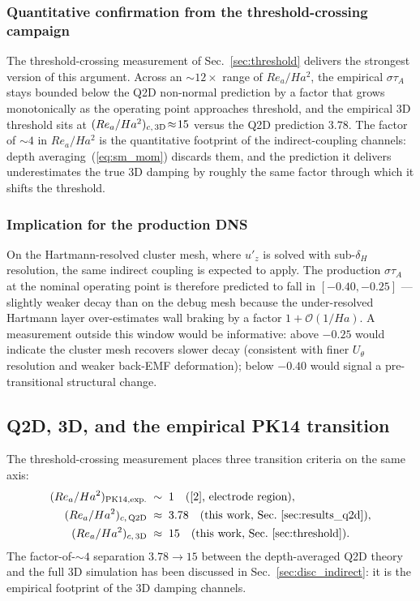 \documentclass[aps,prl,twocolumn,superscriptaddress]{revtex4-2}
\begin{document}
\subsubsection*{Quantitative confirmation from the threshold-crossing
campaign}
The threshold-crossing measurement of Sec.~\ref{sec:threshold}
delivers the strongest version of this argument.  Across an
$\sim\!12\!\times\!$ range of $Re_a/Ha^{2}$, the empirical
$\sigma\tau_A$ stays bounded below the Q2D non-normal prediction by
a factor that grows monotonically as the operating point approaches
threshold, and the empirical 3D threshold sits at
$(Re_a/Ha^{2})_{c,\,\rm 3D}\!\approx\!15$ versus the Q2D prediction
$3.78$.  The factor of $\sim\!4$ in $Re_a/Ha^{2}$ is the
quantitative footprint of the indirect-coupling channels: depth
averaging~(\ref{eq:sm_mom}) discards them, and the prediction it
delivers underestimates the true 3D damping by roughly the same
factor through which it shifts the threshold.

\subsubsection*{Implication for the production DNS}
On the Hartmann-resolved cluster mesh, where $u'_z$ is solved with
sub-$\delta_H$ resolution, the same indirect coupling is expected
to apply.  The production $\sigma\tau_A$ at the nominal operating
point is therefore predicted to fall in $[-0.40,-0.25]$ --- slightly
weaker decay than on the debug mesh because the under-resolved
Hartmann layer over-estimates wall braking by a factor
$1 + \mathcal{O}(1/Ha)$.  A measurement outside this window would be
informative: above $-0.25$ would indicate the cluster mesh recovers
slower decay (consistent with finer $U_\theta$ resolution and weaker
back-EMF deformation); below $-0.40$ would signal a pre-transitional
structural change.

\subsection{Q2D, 3D, and the empirical PK14 transition}
\label{sec:disc_q2d}

The threshold-crossing measurement places three transition criteria
on the same axis:
\begin{align*}
(Re_a/Ha^{2})_{\rm PK14, exp.} &\;\sim\; 1
   \quad\text{(\cite{2}, electrode region)},\\
(Re_a/Ha^{2})_{c,\,\rm Q2D}   &\;\approx\; 3.78
   \quad\text{(this work, Sec.~\ref{sec:results_q2d})},\\
(Re_a/Ha^{2})_{c,\,\rm 3D}    &\;\approx\; 15
   \quad\text{(this work, Sec.~\ref{sec:threshold})}.
\end{align*}
The factor-of-$\sim\!4$ separation $3.78\to 15$ between the
depth-averaged Q2D theory and the full 3D simulation has been
discussed in Sec.~\ref{sec:disc_indirect}: it is the empirical
footprint of the 3D damping channels.
\end{document}
